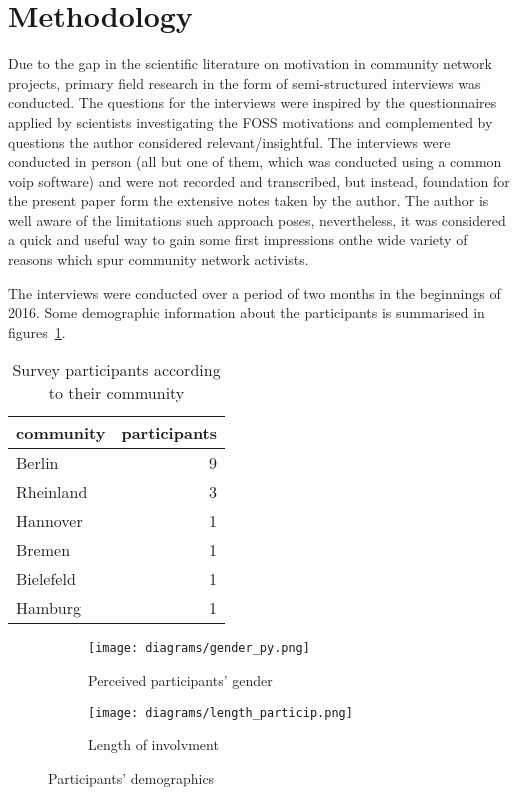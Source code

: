 \section{Methodology}

Due to the gap in the scientific literature on motivation in community network projects, primary field research in the form of semi-structured interviews was conducted.
The questions for the interviews were inspired by the questionnaires applied by scientists investigating the FOSS motivations\cite{HarOu2002}\cite{LakWo2005} and complemented by questions the author considered relevant/insightful. %
The interviews were conducted in person (all but one of them, which was conducted using a common voip software) and were not recorded and transcribed, but instead, foundation for the present paper form the extensive notes taken by the author. %
The author is well aware of the limitations such approach poses, nevertheless, it was considered a quick and useful way to gain some first impressions onthe wide variety of reasons which spur community network activists.

The interviews were conducted over a period of two months in the beginnings of 2016.
Some demographic information about the participants is summarised in figures~\ref{tab:communities}.%

\begin{table}[h]
  \begin{tabular}{| l | r |}
    \hline
    \textbf{community} & \textbf{participants}\\
    \hline
    Berlin & 9 \\
    \hline
    Rheinland & 3 \\
    \hline
    Hannover & 1 \\
    \hline
    Bremen & 1 \\
    \hline
    Bielefeld & 1 \\
    \hline
    Hamburg & 1 \\
    \hline
  \end{tabular}
\caption{Survey participants according to their community}
\label{tab:communities}
\end{table}

\begin{figure}[h]
  \begin{subfigure}[h]{0.5\textwidth}
    \centering
    \texttt{[image: diagrams/gender\_py.png]}
    \caption{Perceived participants' gender}
    \label{fig:gender}
  \end{subfigure}
  \qquad
  \begin{subfigure}[h]{0.5\textwidth}
    \centering
    \texttt{[image: diagrams/length\_particip.png]}
    \caption{Length of involvment}
    \label{fig:length}
  \end{subfigure}
  \caption{Participants' demographics}
\end{figure}

